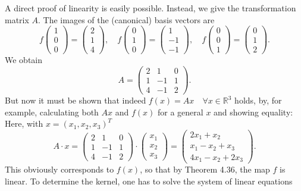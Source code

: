 A direct proof of linearity is easily possible. Instead, we give the transformation matrix \(A\). The images of the (canonical) basis vectors are
\[
f\begin{pmatrix}
1 \\
0 \\
0
\end{pmatrix} =
\begin{pmatrix}
2 \\
1 \\
4
\end{pmatrix} , \quad
f\begin{pmatrix}
0 \\
1 \\
0
\end{pmatrix} =
\begin{pmatrix}
1 \\
-1 \\
-1
\end{pmatrix} , \quad
f\begin{pmatrix}
0 \\
0 \\
1
\end{pmatrix} =
\begin{pmatrix}
0 \\
1 \\
2
\end{pmatrix} .
\]
We obtain
\[
A =
\begin{pmatrix}
2 & 1 & 0 \\
1 & -1 & 1 \\
4 & -1 & 2
\end{pmatrix} .
\]
But now it must be shown that indeed \(f(x) = Ax \quad \forall x \in \mathbb{R}^3\) holds, by, 
for example, calculating both \(Ax\) and \(f(x)\) for a 
general \(x\) and showing equality: Here, with \(x = {(x_1, x_2, x_3)}^T\)
\[
A \cdot x =
\begin{pmatrix}
2 & 1 & 0 \\
1 & -1 & 1 \\
4 & -1 & 2
\end{pmatrix}
\cdot
\begin{pmatrix}
x_1 \\
x_2 \\
x_3
\end{pmatrix} =
\begin{pmatrix}
2x_1 + x_2 \\
x_1 - x_2 + x_3 \\
4x_1 - x_2 + 2x_3
\end{pmatrix} .
\]
This obviously corresponds to \(f(x)\), so that by Theorem 4.36, the map \(f\) is linear. To determine the kernel, one has to solve the system of linear equations
